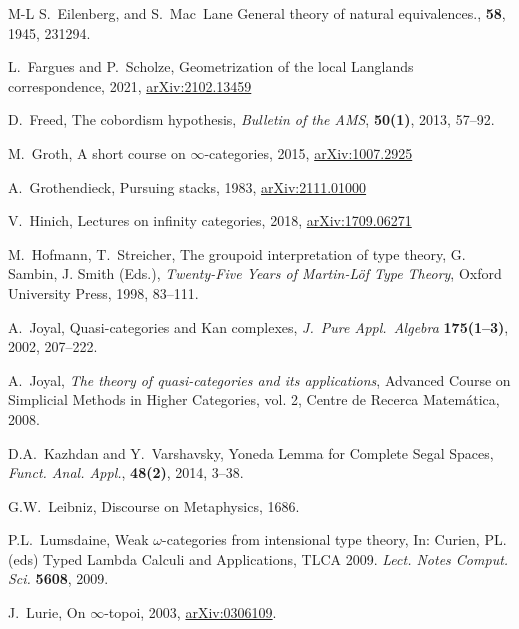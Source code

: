 \documentclass[11pt]{ctexart}
\theoremstyle{definition}
\theoremstyle{remark}
\numberwithin{equation}{section}
\newcommand{\1}{\mathbbe{1}}
\newcommand{\2}{\mathbbe{2}}
\newcommand{\3}{\mathbbe{3}}
\begin{document}
\begin{thebibliography}{M-L}
    S.~Eilenberg, and S.~Mac~Lane \newblock General theory of natural equivalences., {\bf 58}, 1945, 231{\textendash}294.


 L.~Fargues and P.~Scholze, Geometrization of the local Langlands correspondence, 2021, \href{https://arxiv.org/abs/2102.13459}{arXiv:2102.13459}

 D.~Freed, The cobordism hypothesis, \emph{Bulletin of the AMS}, {\bf 50(1)}, 2013, 57--92.


 M.~Groth, A short course on $\infty$-categories, 2015, \href{https://arxiv.org/abs/1007.2925}{arXiv:1007.2925}

 A.~Grothendieck, Pursuing stacks, 1983, \href{https://arxiv.org/abs/2111.01000}{arXiv:2111.01000}

 V.~Hinich, Lectures on infinity categories, 2018, \href{https://arxiv.org/pdf/1709.06271.pdf}{arXiv:1709.06271}

    
     M.~Hofmann, T.~Streicher, \newblock The groupoid interpretation of type theory, \newblock G. Sambin, J. Smith (Eds.), \emph{Twenty-Five Years of Martin-Löf Type Theory}, Oxford University Press,  1998, 83--111.


    
    
     A.~Joyal, Quasi-categories and Kan complexes, {\em J.~Pure Appl.~Algebra} {\bf 175(1--3)}, 2002, 207--222.
    
     A.~Joyal, {\em The theory of quasi-categories and its applications}, Advanced Course on Simplicial Methods in Higher Categories, vol. 2, Centre de Recerca Matem\'{a}tica, 2008.
    
     D.A.~Kazhdan and Y.~Varshavsky,  Yoneda Lemma
    for Complete Segal Spaces, {\em Funct. Anal. Appl.},  {\bf 48(2)}, 2014, 3--38.


     G.W.~Leibniz, Discourse on Metaphysics, 1686.



 P.L.~Lumsdaine, Weak $\omega$-categories from intensional type theory, In: Curien, PL. (eds)  Typed Lambda Calculi and Applications, TLCA 2009. {\em Lect. Notes Comput. Sci.} {\bf 5608}, 2009.

     J.~Lurie, On $\infty$-topoi, 2003, 
      \href{https://arxiv.org/abs/math/0306109}{arXiv:0306109}.


\end{thebibliography}
\end{document}

